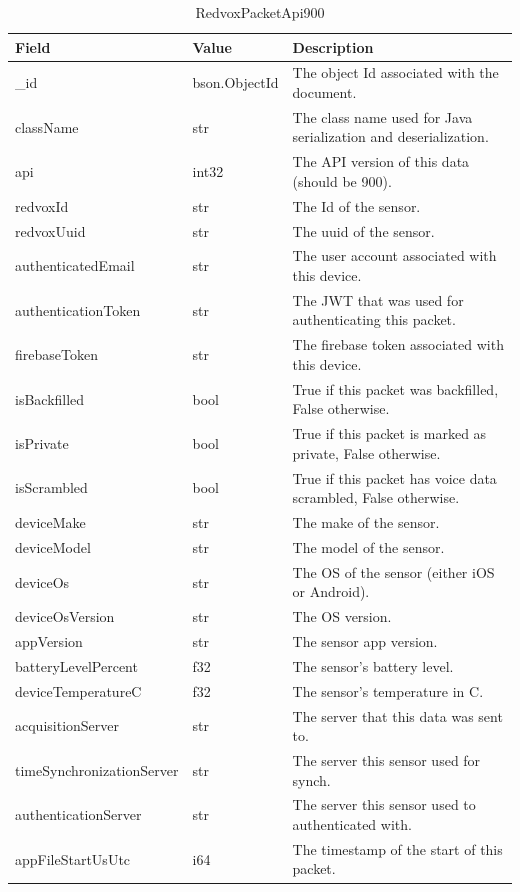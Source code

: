 \begin{table}
	\centering
	\caption{RedvoxPacketApi900}
	\begin{tabularx}{\textwidth}{llX}
		\toprule
		\textbf{Field} & \textbf{Value} & \textbf{Description} \\
		\midrule
		\_id & bson.ObjectId & The object Id associated with the document. \\
		className & str & The class name used for Java serialization and deserialization. \\
		api & int32 & The API version of this data (should be 900). \\
		redvoxId & str & The Id of the sensor. \\
		redvoxUuid & str & The uuid of the sensor. \\
		authenticatedEmail & str & The user account associated with this device. \\
		authenticationToken & str & The JWT that was used for authenticating this packet. \\
		firebaseToken & str & The firebase token associated with this device. \\
		isBackfilled & bool & True if this packet was backfilled, False otherwise. \\
		isPrivate & bool & True if this packet is marked as private, False otherwise. \\
		isScrambled & bool & True if this packet has voice data scrambled, False otherwise. \\
		deviceMake & str & The make of the sensor. \\
		deviceModel & str & The model of the sensor. \\
		deviceOs & str & The OS of the sensor (either iOS or Android). \\
		deviceOsVersion & str & The OS version. \\
		appVersion & str & The sensor app version. \\
		batteryLevelPercent & f32 & The sensor's battery level. \\
		deviceTemperatureC & f32 & The sensor's temperature in C. \\
		acquisitionServer & str & The server that this data was sent to. \\
		timeSynchronizationServer & str & The server this sensor used for synch. \\
		authenticationServer & str & The server this sensor used to authenticated with. \\
		appFileStartUsUtc & i64 & The timestamp of the start of this packet. \\

\end{tabularx}
\end{table}
